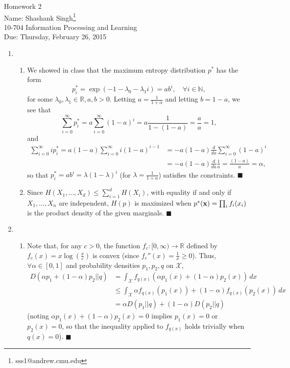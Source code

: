 \documentclass[11pt]{article}
\makeatletter
\newcommand{\myname}{Shashank Singh\footnote{sss1@andrew.cmu.edu}}
\newcommand{\myclass}{10-704 Information Processing and Learning}
\newcommand{\myhwnum}{2}
\newcommand{\duedate}{Thursday, February 26, 2015}
\renewcommand{\qed}{\quad \ensuremath{\blacksquare}}
\newcommand{\N}{\mathbb{N}} %
\newcommand{\R}{\mathbb{R}} %
\newcommand{\X}{\mathcal{X}}
\makeatother
\begin{document}
\thispagestyle{plain}

{\Large Homework \myhwnum} \\
Name: \myname \\
\myclass \\
Due: \duedate

\begin{enumerate}
\item
\begin{enumerate}
\item We showed in class that the maximum entropy distribution $p^*$ has the
form
\[p^*_i
    = \exp\left( -1 - \lambda_0 - \lambda_1 i \right)
    = a b^i,
                                                    \quad \forall i \in \N,\]
for some $\lambda_0,\lambda_1 \in \R, a,b > 0$. Letting
$a = \frac{1}{1 + \alpha}$ and letting $b = 1 - a$, we see that
\[\sum_{i = 0}^\infty p^*_i
    = a \sum_{i = 0}^\infty (1 - a)^i
    = a \frac{1}{1 - (1 - a)}
    = \frac{a}{a}
    = 1,\]
and
\begin{align*}
\sum_{i = 0}^\infty i p^*_i
    = a (1 - a) \sum_{i = 0}^\infty i (1 - a)^{i - 1}
 &  = -a (1 - a) \frac{d}{da} \sum_{i = 0}^\infty (1 - a)^i \\
 &  = -a (1 - a) \frac{d}{da} \frac{1}{a}
    = \frac{(1 - a)}{a}
    = \alpha,
\end{align*}
so that $p^*_i = ab^i = \lambda (1 - \lambda)^i$ (for
$\lambda = \frac{1}{1 + \alpha}$) satisfies the constraints. \qed

\item Since $H(X_1,\dots,X_d) \leq \sum_{i = 1}^d H(X_i)$, with equality if and
only if $X_1,\dots,X_n$ are independent, $H(p)$ is maximized when
$p^*({\bf x}) = \prod_i f_i(x_i)$ is the product density of the given
marginals. \qed
\end{enumerate}

\item
\begin{enumerate}
\item Note that, for any $c > 0$, the function $f_c : [0,\infty) \to \R$
defined by $f_c(x) = x \log \left( \frac{x}{c} \right)$ is convex (since
$f_c''(x) = \frac{1}{x} \geq 0$). Thus, $\forall \alpha \in [0,1]$ and
probability densities $p_1,p_2,q$ on $\X$,
\begin{align*}
D(\alpha p_1 + (1 - \alpha) p_2 || q)
 &  = \int_\X f_{q(x)}(\alpha p_1(x) + (1 - \alpha) p_2(x)) \, dx   \\
 &  \leq \int_\X \alpha f_{q(x)}(p_1(x)) + (1 - \alpha) f_{q(x)}(p_2(x)) \, dx \\
 &  = \alpha D(p_1 || q) + (1 - \alpha) D(p_2 || q)
\end{align*}
(noting $\alpha p_1(x) + (1 - \alpha) p_2(x) = 0$ implies $p_1(x) = 0$ or
$p_2(x) = 0$, so that the inequality applied to $f_{q(x)}$ holds trivially when
$q(x) = 0$). \qed


\end{enumerate}
\end{enumerate}
\end{document}
